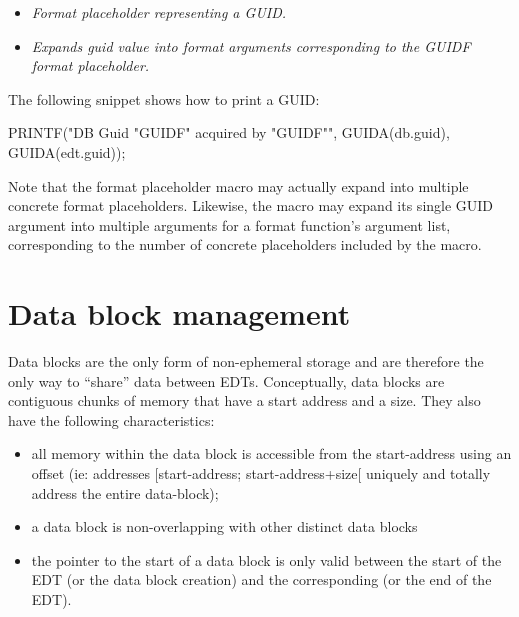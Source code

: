 \begin{itemize}
\item {}
  \small \emph{Format placeholder representing a GUID.}
\item {}
  \small \emph{Expands guid value into format arguments
  corresponding to the GUIDF format placeholder.}
\end{itemize}

The following snippet shows how to print a GUID:
\begin{ocrsnip}
PRINTF("DB Guid "GUIDF" acquired by "GUIDF"\n", GUIDA(db.guid), GUIDA(edt.guid));
\end{ocrsnip}

Note that the  format placeholder macro may actually expand into
multiple concrete format placeholders. Likewise, the  macro may
expand its single GUID argument into multiple arguments for a format function's
argument list, corresponding to the number of concrete placeholders included
by the  macro.
\section{Data block management}
\label{sec:OCRDataBlockManagement}

Data blocks are the only form of non-\/ephemeral storage and are therefore
the only way to ``share'' data between E\-D\-Ts. Conceptually, data blocks
are contiguous chunks of memory that have a start address and a size.
They also have the following characteristics\-:
\begin{itemize}
\item all memory within the data block is accessible from the start-\/address
  using an offset (ie\-: addresses \mbox{[}start-\/address; start-\/address+size\mbox{[}
  uniquely and totally address the entire data-\/block);
\item a data block is non-\/overlapping with other distinct data blocks
\item the pointer to the start of a data block is only valid between the start
of the E\-D\-T (or the data block creation) and the corresponding 
(or the end of the E\-D\-T).
\end{itemize}

